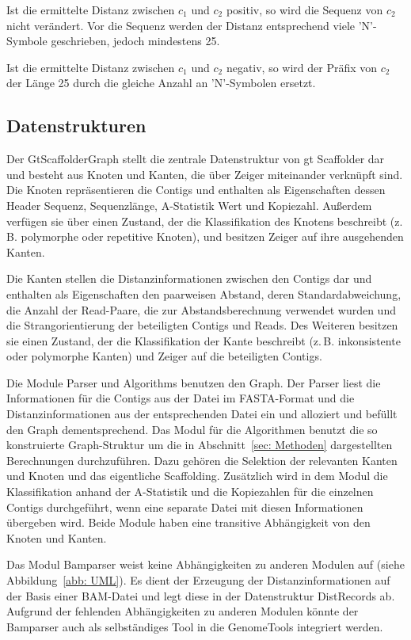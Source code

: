 \documentclass[a4paper,11pt,parskip,abstract=on]{scrartcl}
\begin{document}
Ist die ermittelte Distanz zwischen $c_1$ und $c_2$ positiv, so wird
die Sequenz von $c_2$ nicht verändert. Vor die Sequenz werden der
Distanz entsprechend viele 'N'-Symbole geschrieben, jedoch mindestens
25.

Ist die ermittelte Distanz zwischen $c_1$ und $c_2$ negativ, so wird
der Präfix von $c_2$ der Länge 25 durch die gleiche Anzahl an
'N'-Symbolen ersetzt.

\subsection{Datenstrukturen}
\label{sec: Datenstrukturen}

Der GtScaffolderGraph stellt die zentrale Datenstruktur von gt Scaffolder dar
und besteht aus Knoten und Kanten, die über Zeiger miteinander verknüpft sind.
Die Knoten repräsentieren die Contigs und enthalten als Eigenschaften dessen
Header Sequenz, Sequenzlänge, A-Statistik Wert und Kopiezahl. Außerdem
verfügen sie über einen Zustand, der die Klassifikation des Knotens beschreibt
(z.\,B. polymorphe oder repetitive Knoten), und besitzen Zeiger auf ihre
ausgehenden Kanten.

Die Kanten stellen die Distanzinformationen zwischen den Contigs dar und
enthalten als Eigenschaften den paarweisen Abstand, deren Standardabweichung,
die Anzahl der Read-Paare, die zur Abstandsberechnung verwendet wurden und die
Strangorientierung der beteiligten Contigs und Reads. Des Weiteren besitzen
sie einen Zustand, der die Klassifikation der Kante beschreibt (z.\,B.
inkonsistente oder polymorphe Kanten) und Zeiger auf die beteiligten Contigs.

Die Module Parser und Algorithms benutzen den Graph. Der Parser liest
die Informationen für die Contigs aus der Datei im FASTA-Format und
die Distanzinformationen aus der entsprechenden Datei ein und
alloziert und befüllt den Graph dementsprechend. Das Modul für die
Algorithmen benutzt die so konstruierte Graph-Struktur um die in
Abschnitt~\ref{sec: Methoden} dargestellten Berechnungen
durchzuführen. Dazu gehören die Selektion der relevanten Kanten und
Knoten und das eigentliche Scaffolding. Zusätzlich wird in dem Modul die
Klassifikation anhand der A-Statistik und die Kopiezahlen für die
einzelnen Contigs durchgeführt, wenn eine separate Datei mit diesen
Informationen übergeben wird. Beide Module haben eine transitive
Abhängigkeit von den Knoten und Kanten.

Das Modul Bamparser weist keine Abhängigkeiten zu anderen Modulen auf
(siehe Abbildung~\ref{abb: UML}). Es dient der Erzeugung der
Distanzinformationen auf der Basis einer BAM-Datei und legt diese
in der Datenstruktur DistRecords ab. Aufgrund der fehlenden
Abhängigkeiten zu anderen Modulen könnte der Bamparser auch als
selbständiges Tool in die GenomeTools integriert werden.
\end{document}
